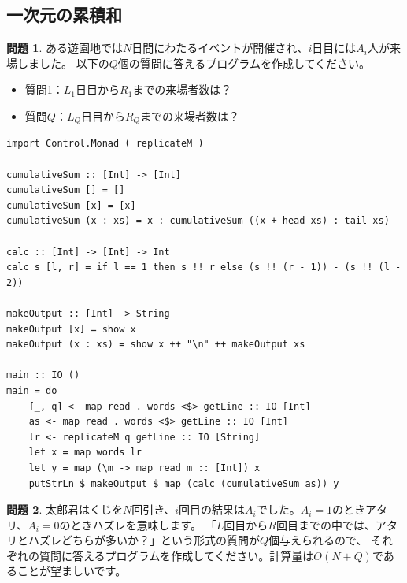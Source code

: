 \documentclass[12pt,a4paper,dvipdfmx,fleqn]{article}%
\theoremstyle{definition}
\newtheorem*{toi*}{問題}
\theoremstyle{definition}
\theoremstyle{definition}
\begin{document}
\subsection{一次元の累積和}\label{一次元の累積和}
\begin{toi*}
    ある遊園地では$N$日間にわたるイベントが開催され、$i$日目には$A_i$人が来場しました。
    以下の$Q$個の質問に答えるプログラムを作成してください。
    \begin{itemize}
        \item [] 質問1：$L_1$日目から$R_1$までの来場者数は？\\[2mm]
        \hspace{2em}{\vdots}
        \item [] 質問$Q$：$L_Q$日目から$R_Q$までの来場者数は？
    \end{itemize}
\end{toi*}
\begin{lstlisting}[caption=A06.hs,label=A06]
import Control.Monad ( replicateM )

cumulativeSum :: [Int] -> [Int]
cumulativeSum [] = []
cumulativeSum [x] = [x]
cumulativeSum (x : xs) = x : cumulativeSum ((x + head xs) : tail xs)

calc :: [Int] -> [Int] -> Int
calc s [l, r] = if l == 1 then s !! r else (s !! (r - 1)) - (s !! (l - 2))

makeOutput :: [Int] -> String
makeOutput [x] = show x
makeOutput (x : xs) = show x ++ "\n" ++ makeOutput xs

main :: IO ()
main = do
    [_, q] <- map read . words <$> getLine :: IO [Int]
    as <- map read . words <$> getLine :: IO [Int]
    lr <- replicateM q getLine :: IO [String]
    let x = map words lr
    let y = map (\m -> map read m :: [Int]) x
    putStrLn $ makeOutput $ map (calc (cumulativeSum as)) y
\end{lstlisting}
\begin{toi*}
    太郎君はくじを$N$回引き、$i$回目の結果は$A_i$でした。$A_i=1$のときアタリ、$A_i=0$のときハズレを意味します。
    「$L$回目から$R$回目までの中では、アタリとハズレどちらが多いか？」という形式の質問が$Q$個与えられるので、
    それぞれの質問に答えるプログラムを作成してください。計算量は$O(N+Q)$であることが望ましいです。
\end{toi*}
\end{document}
